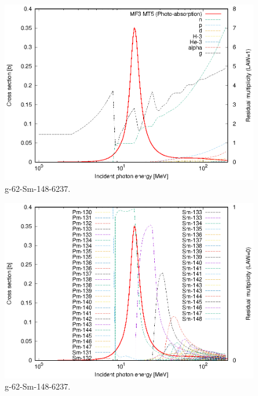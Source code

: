 \begin{figure}
 \includegraphics[width=\linewidth]{eps/g_62-Sm-148_6237.eps}
  \caption{g-62-Sm-148-6237.}
\end{figure}
\begin{figure}
 \includegraphics[width=\linewidth]{eps-law0/g_62-Sm-148_6237.eps}
 \caption{g-62-Sm-148-6237.}
\end{figure}
\newpage \clearpage

